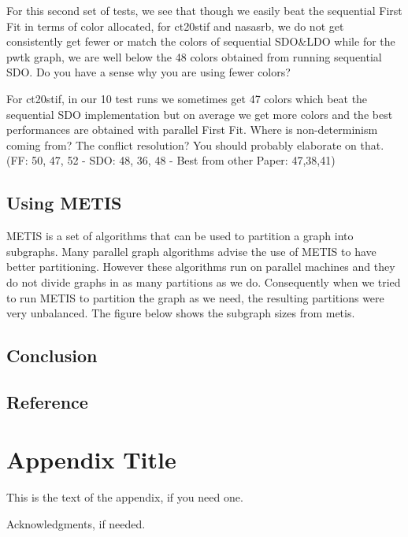\documentclass[preprint]{sigplanconf}
\begin{document}
For this second set of tests, we see that though we easily beat the sequential First Fit in terms of color allocated, for ct20stif and nasasrb, we do not get consistently get fewer or match the colors of sequential SDO$\&$LDO while for the pwtk graph, we are well below the 48 colors obtained from running sequential SDO.  Do you have a sense why you are using fewer colors?

For ct20stif, in our 10 test runs we sometimes get 47 colors which beat the sequential SDO implementation but on average we get more colors and the best performances are obtained with parallel First Fit. Where is non-determinism coming from?  The conflict resolution?  You should probably elaborate on that.
(FF: 50, 47, 52 - SDO: 48, 36, 48 - Best from other Paper: 47,38,41)\

\subsection{Using METIS}
METIS is a set of algorithms that can be used to partition a graph into subgraphs. Many parallel graph algorithms advise the use of METIS to have better partitioning. However these algorithms run on parallel machines and they do not divide graphs in as many partitions as we do. Consequently when we tried to run METIS to partition the graph as we need, the resulting partitions were very unbalanced. The figure below shows the subgraph sizes from metis.


\subsection{Conclusion}

\subsection{Reference}



\appendix
\section{Appendix Title}

This is the text of the appendix, if you need one.

\acks

Acknowledgments, if needed.











\end{document}
